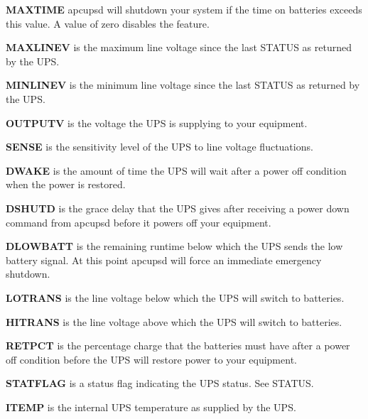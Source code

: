 {{{{{{{{{{{{{{{\begin{description}
\item {\bf MAXTIME}
apcupsd will shutdown your system if the time on batteries exceeds this value.
A value of zero disables the feature.  

\item {\bf MAXLINEV}
is the maximum line voltage since the last STATUS as returned by the UPS.  

\item {\bf MINLINEV}
is the minimum line voltage since the last STATUS as returned by the UPS.  

\item {\bf OUTPUTV}
is the voltage the UPS is supplying to your equipment.  

\item {\bf SENSE}
is the sensitivity level of the UPS to line voltage fluctuations.  

\item {\bf DWAKE}
is the amount of time the UPS will wait after a power off condition when the
power is restored.  

\item {\bf DSHUTD}
is the grace delay that the UPS gives after receiving a power down command
from apcupsd before it powers off your equipment.  

\item {\bf DLOWBATT}
is the remaining runtime below which the UPS sends the low battery signal. At
this point apcupsd will force an immediate emergency shutdown.  

\item {\bf LOTRANS}
is the line voltage below which the UPS will switch to batteries.  

\item {\bf HITRANS}
is the line voltage above which the UPS will switch to batteries.  

\item {\bf RETPCT}
is the percentage charge that the batteries must have after a power off
condition before the UPS will restore power to your equipment.  

\item {\bf STATFLAG}
is a status flag indicating the UPS status. See STATUS.  

\item {\bf ITEMP}
is the internal UPS temperature as supplied by the UPS.  


\end{description}}}}}}}}}}}}}}}}
